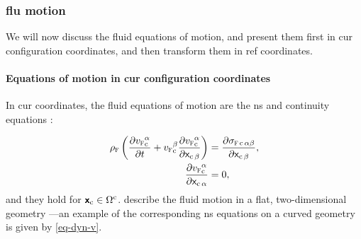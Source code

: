 \subsubsection{\Acl{flu} motion}
\label{sec_fl_mem_flu}



We will now discuss the fluid equations of motion, and present them first in \ac{cur} configuration coordinates, and then transform them in \ac{ref} coordinates.


\paragraph{Equations of motion in  \acl{cur} configuration coordinates}
\label{sec_fl_mem_flu_cur}

In \ac{cur} coordinates, the fluid equations of motion are the \ac{ns} and continuity equations \cite{landauFluidMechanics1987}:

\begin{align}
    \label{eq_fl_rigid_fl_1_current}
    \rho_\fluid \left( \pder{\vfc^\alpha}{t} + \vfc^\beta  \pderc{\vfc^\alpha}{\beta} \right) & =  \pderc{  \sigmastressc{\alpha}{\beta}}{\beta} ,                                               \\
    \label{eq_fl_rigid_fl_2_current}
    \pderc{ \vfc^\alpha }{\alpha}                                                             & =                                                              0                               ,
\end{align}
and they hold for ${\bm{{\mathsf{x}}}_{\textrm{c}}} \in \Omega^{\textrm{c}}$.
\Cref{\eqsbfluc} describe the fluid motion in a flat, two-dimensional geometry \cite{landauFluidMechanics1987}---an example of the corresponding  \ac{ns} equations on a curved geometry is given by \cref{eq-dyn-v}.



